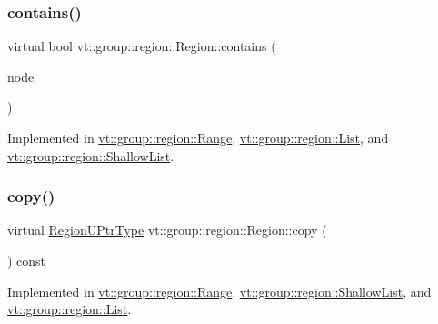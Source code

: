 \subsubsection{\texorpdfstring{contains()}{contains()}}
{\footnotesize\ttfamily virtual bool vt\+::group\+::region\+::\+Region\+::contains (\begin{DoxyParamCaption}\item[{\hyperlink{namespacevt_a866da9d0efc19c0a1ce79e9e492f47e2}{Node\+Type} const \&}]{node }\end{DoxyParamCaption})\hspace{0.3cm}{\ttfamily [pure virtual]}}



Implemented in \hyperlink{structvt_1_1group_1_1region_1_1_range_a1e8b87b37b06d3803fd3b287fde3564b}{vt\+::group\+::region\+::\+Range}, \hyperlink{structvt_1_1group_1_1region_1_1_list_ac85ec02f77a44a2dadc1b51231e113a7}{vt\+::group\+::region\+::\+List}, and \hyperlink{structvt_1_1group_1_1region_1_1_shallow_list_a58313e5cab61f196ff5fb1d6ac109d1c}{vt\+::group\+::region\+::\+Shallow\+List}.

\mbox{\label{structvt_1_1group_1_1region_1_1_region_a040d20a4f8c6fa351d7fe1cbfcae3a03}} 
\subsubsection{\texorpdfstring{copy()}{copy()}}
{\footnotesize\ttfamily virtual \hyperlink{structvt_1_1group_1_1region_1_1_region_ae5f42cf159116a3cf8bd65423eb01037}{Region\+U\+Ptr\+Type} vt\+::group\+::region\+::\+Region\+::copy (\begin{DoxyParamCaption}{ }\end{DoxyParamCaption}) const\hspace{0.3cm}{\ttfamily [pure virtual]}}



Implemented in \hyperlink{structvt_1_1group_1_1region_1_1_range_a9b7985ec60471524e11bb933fd0f6821}{vt\+::group\+::region\+::\+Range}, \hyperlink{structvt_1_1group_1_1region_1_1_shallow_list_a43434547454d02f9069873282675058f}{vt\+::group\+::region\+::\+Shallow\+List}, and \hyperlink{structvt_1_1group_1_1region_1_1_list_ac5885572f4cd651003cd6012ba247cda}{vt\+::group\+::region\+::\+List}.

